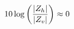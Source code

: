 \documentclass[preview]{standalone}
\begin{document}
\begin{align*}
\special{dvisvgm:raw <g id='unique000'>}10 \log{\left(\frac{\lvert Z_h \rvert}{\lvert Z_v \rvert}\right)} \approx 0\special{dvisvgm:raw </g>}
\end{align*}
\end{document}
